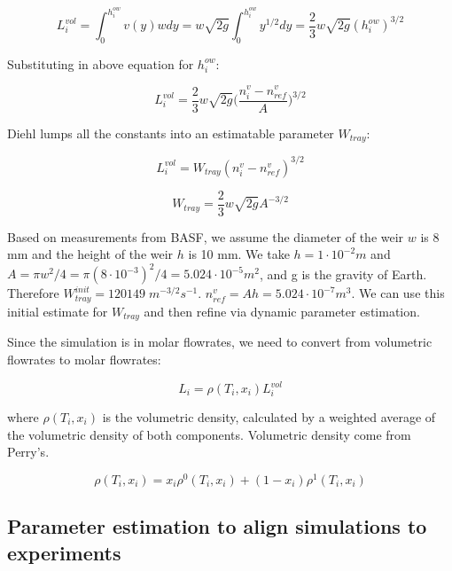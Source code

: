\begin{equation}
    L_i^{vol} = \int_0^{h_i^{ow}} v(y)wdy = w\sqrt{2g}\int_0^{h_i^{ow}} y^{1/2}dy = \frac{2}{3}w\sqrt{2g}(h_i^{ow})^{3/2} 
\end{equation}


Substituting in above equation for  $h_i^{ow}$:

\begin{equation}
   L_i^{vol} = \frac{2}{3} w\sqrt{2g}\biggl(\frac{n^v_i-n^v_{ref}}{A}\biggr)^{3/2}  
\end{equation}

Diehl lumps all the constants into an estimatable parameter $W_{tray}$:

\begin{equation}
    L_i^{vol} = W_{tray}(n_i^v-n^v_{ref})^{3/2}
\end{equation}

\begin{equation}
    W_{tray} = \frac{2}{3}w\sqrt{2g}A^{-3/2}
\end{equation}

Based on measurements from BASF, we assume the diameter of the weir $w$ is 8 mm and the height of the weir $h$ is 10 mm. We take $h = 1\cdot10^{-2} m$ and $A=\pi w^2/4 = \pi(8 \cdot 10^{-3})^2/4 = 5.024 \cdot 10^{-5} m^2$, and g is the gravity of Earth. Therefore $W_{tray}^{init}=120149 \; m^{-3/2}s^{-1}$. $n^v_{ref}=Ah=5.024 \cdot 10^{-7} m^3$.  We can use this initial estimate for $W_{tray}$ and then refine via dynamic parameter estimation.

Since the simulation is in molar flowrates, we need to convert from volumetric flowrates to molar flowrates:

\begin{equation}
    L_i = \rho(T_i, x_i)L^{vol}_i  
\end{equation}


where $\rho(T_i,x_i)$ is the volumetric density, calculated by a weighted average of the volumetric density of both components. Volumetric density come from Perry’s.

\begin{equation}
    \rho(T_i, x_i) = x_i\rho^0(T_i, x_i) + (1-x_i)\rho^1(T_i, x_i)
\end{equation}


\subsection{Parameter estimation to align simulations to experiments}

